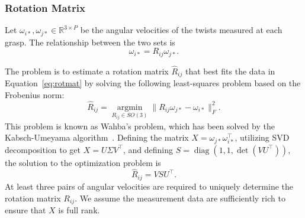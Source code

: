 \documentclass[letterpaper, 10 pt, journal, twoside]{IEEEtran}
\newcommand{\real}{\mathbb{R}}
\begin{document}
\subsubsection{Rotation Matrix}
Let $\omega_{i*}, \omega_{j*} \in \mathbb{R}^{3 \times P}$ be the angular velocities of the twists measured at each grasp. The relationship between the two sets is
\begin{equation}
    \omega_{i*} = R_{ij} \omega_{j*} \label{eq:rotmat}
.\end{equation}

The problem is to estimate a rotation matrix $\hat{R}_{ij}$ that best fits the data in Equation~\eqref{eq:rotmat} by solving the following least-squares problem based on the Frobenius norm:
\begin{equation}
    \hat{R}_{ij} = \underset{R_{ij} \in SO(3)}{\operatorname{argmin}}  \|R_{ij} \omega_{j*} - \omega_{i*}\| _F ^2.
    \label{eqn:rotation}
\end{equation}
This problem is known as Wahba's problem, which has been solved by the Kabsch-Umeyama algorithm~\cite{kabsch1976,kabsch1978,umeyama1991}.
Defining the matrix $X = \omega_{j*} \omega_{i*}^\intercal$, utilizing SVD decomposition to get $X = U \Sigma V^\intercal$, and defining $S = \operatorname{diag}(1,1,\operatorname{det}(VU^\intercal))$, the solution to the optimization problem is 
\begin{equation}
    \hat{R}_{ij} = VSU^\intercal.
    \label{eqn:rotation2}
\end{equation}
At least three pairs of angular velocities are required to uniquely determine the rotation matrix $R_{ij}$. We assume the measurement data are sufficiently rich to ensure that $X$ is full rank.





\end{document}
